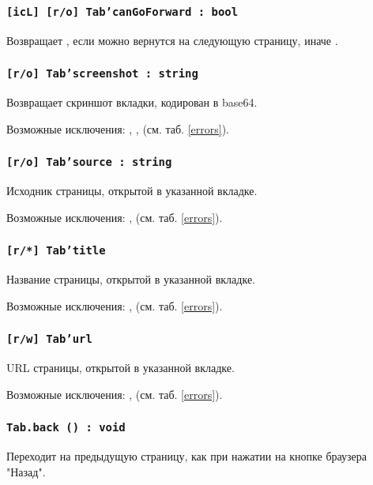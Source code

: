 \subsubsection{\texttt{[icL] [r/o] Tab'canGoForward : bool}}

Возвращает \true, если можно вернутся на следующую страницу, иначе \false.

\subsubsection{\texttt{[r/o] Tab'screenshot : string}}

Возвращает скриншот вкладки, кодирован в base64.

Возможные исключения: , ,  (см. таб. \ref{errors}).

\subsubsection{\texttt{[r/o] Tab'source : string}}

Исходник страницы, открытой в указанной вкладке.

Возможные исключения: ,  (см. таб. \ref{errors}).

\subsubsection{\texttt{[r/*] Tab'title}}

Название страницы, открытой в указанной вкладке.

Возможные исключения: ,  (см. таб. \ref{errors}).

\subsubsection{\texttt{[r/w] Tab'url}}

URL страницы, открытой в указанной вкладке.

Возможные исключения: ,  (см. таб. \ref{errors}).

\subsubsection{\texttt{Tab.back () : void}}

Переходит на предыдущую страницу, как при нажатии на кнопке браузера "Назад".

